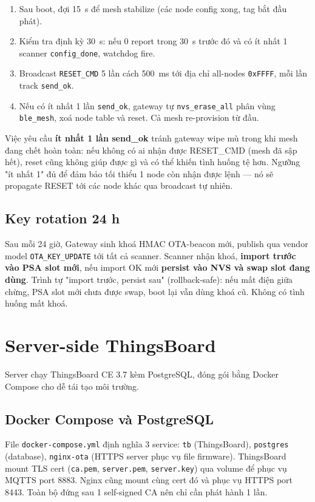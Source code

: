 \begin{enumerate}
    \item Sau boot, đợi 15~s để mesh stabilize (các node config xong, tag bắt đầu phát).
    \item Kiểm tra định kỳ 30~s: nếu 0 report trong 30~s trước đó và có ít nhất 1 scanner \texttt{config\_done}, watchdog fire.
    \item Broadcast \texttt{RESET\_CMD} 5 lần cách 500~ms tới địa chỉ all-nodes \texttt{0xFFFF}, mỗi lần track \texttt{send\_ok}.
    \item Nếu có ít nhất 1 lần \texttt{send\_ok}, gateway tự \texttt{nvs\_erase\_all} phân vùng \texttt{ble\_mesh}, xoá node table và reset. Cả mesh re-provision từ đầu.
\end{enumerate}

Việc yêu cầu \textbf{ít nhất 1 lần send\_ok} tránh gateway wipe mù trong khi mesh đang chết hoàn toàn: nếu không có ai nhận được RESET\_CMD (mesh đã sập hết), reset cũng không giúp được gì và có thể khiến tình huống tệ hơn. Ngưỡng "ít nhất 1" đủ để đảm bảo tối thiểu 1 node còn nhận được lệnh — nó sẽ propagate RESET tới các node khác qua broadcast tự nhiên.

\subsection{Key rotation 24 h}

Sau mỗi 24 giờ, Gateway sinh khoá HMAC OTA-beacon mới, publish qua vendor model \texttt{OTA\_KEY\_UPDATE} tới tất cả scanner. Scanner nhận khoá, \textbf{import trước vào PSA slot mới}, nếu import OK mới \textbf{persist vào NVS và swap slot đang dùng}. Trình tự "import trước, persist sau" (rollback-safe): nếu mất điện giữa chừng, PSA slot mới chưa được swap, boot lại vẫn dùng khoá cũ. Không có tình huống mất khoá.

\section{Server-side ThingsBoard}

Server chạy ThingsBoard CE 3.7 kèm PostgreSQL, đóng gói bằng Docker Compose cho dễ tái tạo môi trường.

\subsection{Docker Compose và PostgreSQL}

File \texttt{docker-compose.yml} định nghĩa 3 service: \texttt{tb} (ThingsBoard), \texttt{postgres} (database), \texttt{nginx-ota} (HTTPS server phục vụ file firmware). ThingsBoard mount TLS cert (\texttt{ca.pem}, \texttt{server.pem}, \texttt{server.key}) qua volume để phục vụ MQTTS port 8883. Nginx cũng mount cùng cert đó và phục vụ HTTPS port 8443. Toàn bộ đứng sau 1 self-signed CA nên chỉ cần phát hành 1 lần.

